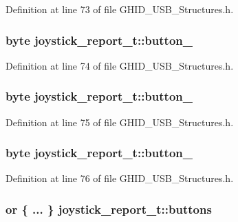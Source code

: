 \-Definition at line 73 of file \-G\-H\-I\-D\-\_\-\-U\-S\-B\-\_\-\-Structures.\-h.

\hypertarget{structjoystick__report__t_a962c2ec3124700193a5153f9efe862bd}{
\subsubsection[{button\-\_\-6}]{\setlength{\rightskip}{0pt plus 5cm}byte {\bf joystick\-\_\-report\-\_\-t\-::button\-\_}}}\label{structjoystick__report__t_a962c2ec3124700193a5153f9efe862bd}


\-Definition at line 74 of file \-G\-H\-I\-D\-\_\-\-U\-S\-B\-\_\-\-Structures.\-h.

\hypertarget{structjoystick__report__t_af93282ad1ac14cace7c2c1739b6d0998}{
\subsubsection[{button\-\_\-7}]{\setlength{\rightskip}{0pt plus 5cm}byte {\bf joystick\-\_\-report\-\_\-t\-::button\-\_}}}\label{structjoystick__report__t_af93282ad1ac14cace7c2c1739b6d0998}


\-Definition at line 75 of file \-G\-H\-I\-D\-\_\-\-U\-S\-B\-\_\-\-Structures.\-h.

\hypertarget{structjoystick__report__t_a26bd852e878a85aa8bfe428832cc8fe6}{
\subsubsection[{button\-\_\-8}]{\setlength{\rightskip}{0pt plus 5cm}byte {\bf joystick\-\_\-report\-\_\-t\-::button\-\_}}}\label{structjoystick__report__t_a26bd852e878a85aa8bfe428832cc8fe6}


\-Definition at line 76 of file \-G\-H\-I\-D\-\_\-\-U\-S\-B\-\_\-\-Structures.\-h.

\hypertarget{structjoystick__report__t_a5a39512aea5d9e0e59ecb492aa9708f2}{
\subsubsection[{buttons}]{\setlength{\rightskip}{0pt plus 5cm}or \{ ... \}  {\bf joystick\-\_\-report\-\_\-t\-::buttons}}}\label{structjoystick__report__t_a5a39512aea5d9e0e59ecb492aa9708f2}


